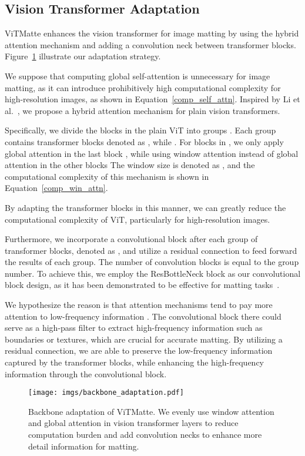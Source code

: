 \documentclass[10pt,twocolumn,letterpaper]{article}
\newcommand{\thename}{ViTMatte}
\begin{document}
\subsection{Vision Transformer Adaptation}

\thename{} enhances the vision transformer for image matting by using the hybrid attention mechanism and adding a convolution neck between transformer blocks. Figure~\ref{fig:backbone_adaptation} illustrate our adaptation strategy.

We suppose that computing global self-attention is unnecessary for image matting, as it can introduce prohibitively high computational complexity for high-resolution images, as shown in Equation~\eqref{comp_self_attn}. Inspired by Li et al.~\cite{vitdet}, we propose a hybrid attention mechanism for plain vision transformers.

Specifically, we divide the blocks in the plain ViT into  groups . Each group contains  transformer blocks denoted as , while . For blocks in , we only apply global attention in the last block , while using window attention instead of global attention in the other blocks  The window size is denoted as , and the computational complexity of this mechanism is shown in Equation~\eqref{comp_win_attn}.




By adapting the transformer blocks in this manner, we can greatly reduce the computational complexity of ViT, particularly for high-resolution images.

Furthermore, we incorporate a convolutional block after each group of transformer blocks, denoted as , and utilize a residual connection to feed forward the results of each group. The number of convolution blocks is equal to the group number. To achieve this, we employ the ResBottleNeck \cite{res} block as our convolutional block design, as it has been demonstrated to be effective for matting tasks~\cite{GCAMatting, MGM}.

We hypothesize the reason is that attention mechanisms tend to pay more attention to low-frequency information \cite{iformer}. The convolutional block there could serve as a high-pass filter to extract high-frequency information such as boundaries or textures, which are crucial for accurate matting. By utilizing a residual connection, we are able to preserve the low-frequency information captured by the transformer blocks, while enhancing the high-frequency information through the convolutional block.

\begin{figure}[tbp]
    \centering
    \texttt{[image: imgs/backbone\_adaptation.pdf]}
    \caption{Backbone adaptation of \thename{}. We evenly use window attention and global attention in vision transformer layers to reduce computation burden and add convolution necks to enhance more detail information for matting.}
    \label{fig:backbone_adaptation}
\end{figure}
\end{document}
